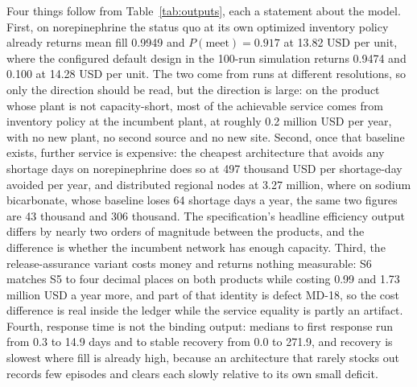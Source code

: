 Four things follow from Table~\ref{tab:outputs}, each a statement about the model. First, on
norepinephrine the status quo at its own optimized inventory policy already returns mean fill
0.9949 and $P(\text{meet}) = 0.917$ at 13.82 USD per unit, where the configured default design
in the 100-run simulation returns 0.9474 and 0.100 at 14.28 USD per unit. The two come from runs
at different resolutions, so only the direction should be read, but the direction is large: on
the product whose plant is not capacity-short, most of the achievable service comes from
inventory policy at the incumbent plant, at roughly 0.2 million USD per year, with no new plant,
no second source and no new site. Second, once that baseline exists, further service is
expensive: the cheapest architecture that avoids any shortage days on norepinephrine does so at
497 thousand USD per shortage-day avoided per year, and distributed regional nodes at 3.27
million, where on sodium bicarbonate, whose baseline loses 64 shortage days a year, the same two
figures are 43 thousand and 306 thousand. The specification's headline efficiency output differs
by nearly two orders of magnitude between the products, and the difference is whether the
incumbent network has enough capacity. Third, the release-assurance variant costs money and
returns nothing measurable: S6 matches S5 to four decimal places on both products while costing
0.99 and 1.73 million USD a year more, and part of that identity is defect MD-18, so the cost
difference is real inside the ledger while the service equality is partly an artifact. Fourth,
response time is not the binding output: medians to first response run from 0.3 to 14.9 days and
to stable recovery from 0.0 to 271.9, and recovery is slowest where fill is already high, because
an architecture that rarely stocks out records few episodes and clears each slowly relative to
its own small deficit.

